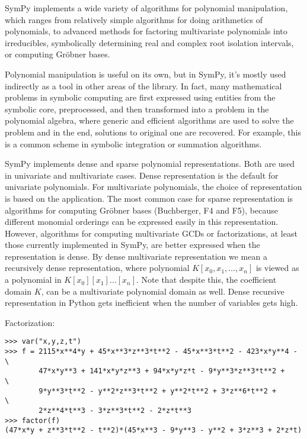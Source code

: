 
SymPy implements a wide variety of algorithms for polynomial manipulation,
which ranges from relatively simple algorithms for doing arithmetics of
polynomials, to advanced methods for factoring multivariate polynomials
into irreducibles, symbolically determining real and complex root isolation
intervals, or computing Gröbner bases.

Polynomial manipulation is useful on its own, but in SymPy, it's mostly
used indirectly as a tool in other areas of the library. In fact, many
mathematical problems in symbolic computing are first expressed using
entities from the symbolic core, preprocessed, and then transformed into
a problem in the polynomial algebra, where generic and efficient algorithms
are used to solve the problem and in the end, solutions to original one
are recovered. For example, this is a common scheme in symbolic integration
or summation algorithms.

SymPy implements dense and sparse polynomial representations. Both
are used in univariate and multivariate cases. Dense representation is
the default for univariate polynomials. For multivariate polynomials,
the choice of representation is based on the application. The most common
case for sparse representation is algorithms for computing Gröbner bases
(Buchberger, F4 and F5), because different monomial orderings can be
expressed easily in this representation. However, algorithms for computing
multivariate GCDs or factorizations, at least those currently implemented
in SymPy, are better expressed when the representation is dense. By dense
multivariate representation we mean a recursively dense representation,
where polynomial $K[x_0, x_1,\dots, x_n]$ is viewed as a polynomial in
$K[x_0][x_1]\ldots[x_n]$. Note that despite this, the coefficient domain
$K$, can be a multivariate polynomial domain as well. Dense recursive
representation in Python gets inefficient when the number of variables
gets high.

\noindent Factorization:
\begin{verbatim}
>>> var("x,y,z,t")
>>> f = 2115*x**4*y + 45*x**3*z**3*t**2 - 45*x**3*t**2 - 423*x*y**4 - \
        47*x*y**3 + 141*x*y*z**3 + 94*x*y*z*t - 9*y**3*z**3*t**2 +    \
        9*y**3*t**2 - y**2*z**3*t**2 + y**2*t**2 + 3*z**6*t**2 +      \
        2*z**4*t**3 - 3*z**3*t**2 - 2*z*t**3
>>> factor(f)
(47*x*y + z**3*t**2 - t**2)*(45*x**3 - 9*y**3 - y**2 + 3*z**3 + 2*z*t)
\end{verbatim}

